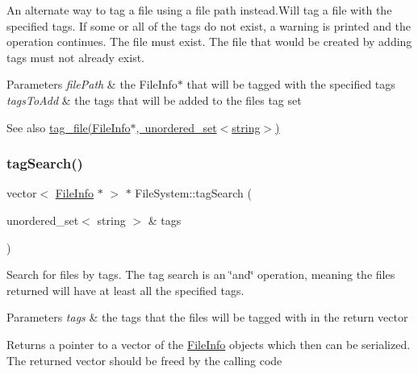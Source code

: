 An alternate way to tag a file using a file path instead.\+Will tag a file with the specified tags. If some or all of the tags do not exist, a warning is printed and the operation continues. The file must exist. The file that would be created by adding tags must not already exist. 
\begin{DoxyParams}{Parameters}
{\em file\+Path} & the File\+Info$\ast$ that will be tagged with the specified tags \\
\hline
{\em tags\+To\+Add} & the tags that will be added to the file\textquotesingle{}s tag set \\
\hline
\end{DoxyParams}
\begin{DoxySeeAlso}{See also}
\mbox{\hyperlink{classFileSystem_a33649a9100b30978db80654ece6504f4}{tag\+\_\+file(\+File\+Info$\ast$, unordered\+\_\+set$<$string$>$)}} 
\end{DoxySeeAlso}
\mbox{\label{classFileSystem_afa5afeedec00348c8d1ab922dac9b086}} 
\subsubsection{\texorpdfstring{tag\+Search()}{tagSearch()}}
{\footnotesize\ttfamily vector$<$ \mbox{\hyperlink{classFileInfo}{File\+Info}} $\ast$ $>$ $\ast$ File\+System\+::tag\+Search (\begin{DoxyParamCaption}\item[{unordered\+\_\+set$<$ string $>$ \&}]{tags }\end{DoxyParamCaption})}

Search for files by tags. The tag search is an \char`\"{}and\char`\"{} operation, meaning the files returned will have at least all the specified tags. 
\begin{DoxyParams}{Parameters}
{\em tags} & the tags that the files will be tagged with in the return vector \\
\hline
\end{DoxyParams}
\begin{DoxyReturn}{Returns}
a pointer to a vector of the \mbox{\hyperlink{classFileInfo}{File\+Info}} objects which then can be serialized. The returned vector should be freed by the calling code 
\end{DoxyReturn}
\mbox{\label{classFileSystem_ac41a4071cfd0f4470f606e24c04740b7}} 

